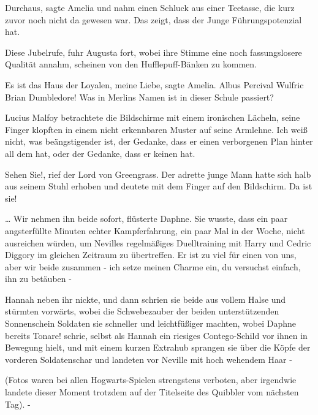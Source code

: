 \glqq Durchaus\grqq{}, sagte Amelia und nahm einen Schluck aus einer Teetasse,
die kurz zuvor noch nicht da gewesen war. \glqq Das zeigt, dass der Junge
Führungspotenzial hat.\grqq{}

\glqq Diese Jubelrufe\grqq{}, fuhr Augusta fort, wobei ihre Stimme eine noch
fassungslosere Qualität annahm, \glqq scheinen von den Hufflepuff-Bänken zu
kommen.\grqq{}

\glqq Es ist das Haus der Loyalen, meine Liebe\grqq{}, sagte Amelia. \glqq Albus
Percival Wulfric Brian Dumbledore! Was in Merlins Namen ist in dieser Schule
passiert?\grqq{}

Lucius Malfoy betrachtete die Bildschirme mit einem ironischen Lächeln, seine
Finger klopften in einem nicht erkennbaren Muster auf seine Armlehne. \glqq Ich
weiß nicht, was beängstigender ist, der Gedanke, dass er einen verborgenen Plan
hinter all dem hat, oder der Gedanke, dass er keinen hat.\grqq{}

\glqq Sehen Sie!\grqq{}, rief der Lord von Greengrass. Der adrette junge Mann
hatte sich halb aus seinem Stuhl erhoben und deutete mit dem Finger auf den
Bildschirm. \glqq Da ist sie!\grqq{}

… \glqq Wir nehmen ihn beide sofort\grqq{}, flüsterte Daphne. Sie wusste, dass
ein paar angsterfüllte Minuten echter Kampferfahrung, ein paar Mal in der Woche,
nicht ausreichen würden, um Nevilles regelmäßiges Duelltraining mit Harry und
Cedric Diggory im gleichen Zeitraum zu übertreffen. \glqq Er ist zu viel für
einen von uns, aber wir beide zusammen - ich setze meinen Charme ein, du
versuchst einfach, ihn zu betäuben -\grqq{}

Hannah neben ihr nickte, und dann schrien sie beide aus vollem Halse und
stürmten vorwärts, wobei die Schwebezauber der beiden unterstützenden
Sonnenschein Soldaten sie schneller und leichtfüßiger machten, wobei Daphne
bereits \glqq Tonare!\grqq{} schrie, selbst als Hannah ein riesiges
Contego-Schild vor ihnen in Bewegung hielt, und mit einem kurzen Extrahub
sprangen sie über die Köpfe der vorderen Soldatenschar und landeten vor Neville
mit hoch wehendem Haar -

(Fotos waren bei allen Hogwarts-Spielen strengstens verboten, aber irgendwie
landete dieser Moment trotzdem auf der Titelseite des Quibbler vom nächsten
Tag). -

